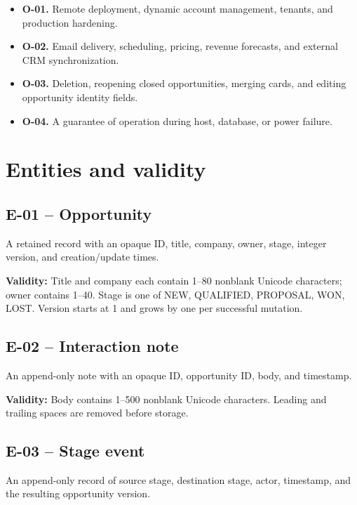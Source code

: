 \documentclass[10pt,a4paper]{article}
\begin{document}
\begin{itemize}

\item \textbf{O-01.} Remote deployment, dynamic account management, tenants, and production hardening.

\item \textbf{O-02.} Email delivery, scheduling, pricing, revenue forecasts, and external CRM synchronization.

\item \textbf{O-03.} Deletion, reopening closed opportunities, merging cards, and editing opportunity identity fields.

\item \textbf{O-04.} A guarantee of operation during host, database, or power failure.

\end{itemize}

\section{Entities and validity}

\subsection{E-01 -- Opportunity}

A retained record with an opaque ID, title, company, owner, stage, integer version, and creation/update times.

\textbf{Validity:} Title and company each contain 1--80 nonblank Unicode characters; owner contains 1--40. Stage is one of NEW, QUALIFIED, PROPOSAL, WON, LOST. Version starts at 1 and grows by one per successful mutation.

\subsection{E-02 -- Interaction note}

An append-only note with an opaque ID, opportunity ID, body, and timestamp.

\textbf{Validity:} Body contains 1--500 nonblank Unicode characters. Leading and trailing spaces are removed before storage.

\subsection{E-03 -- Stage event}

An append-only record of source stage, destination stage, actor, timestamp, and the resulting opportunity version.
\end{document}
